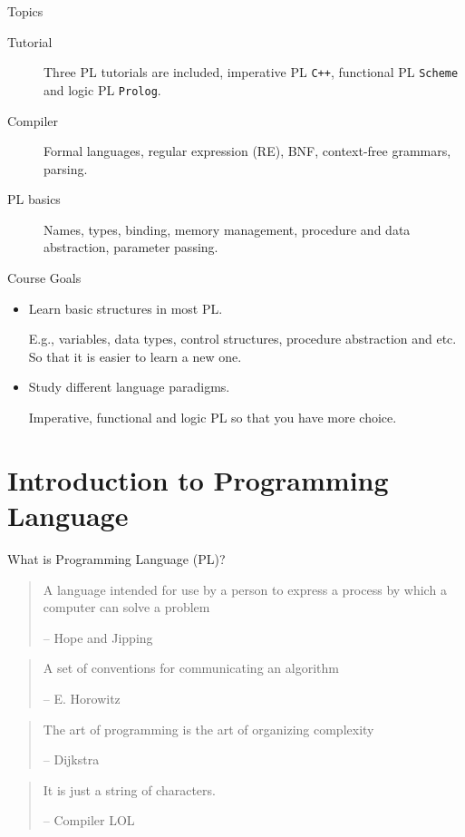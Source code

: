 \documentclass[presentation]{beamer}
\begin{document}
\begin{frame}[fragile,label={sec:orgheadline4}]{Topics}
 \begin{description}
\item[{Tutorial}] Three PL tutorials are included, imperative PL
\texttt{C++}, functional PL \texttt{Scheme} and logic PL \texttt{Prolog}.
\item[{Compiler}] Formal languages, regular expression (RE), BNF,
context-free grammars, parsing.
\item[{PL basics}] Names, types, binding, memory management, procedure
and data abstraction, parameter passing.
\end{description}
\end{frame}

\begin{frame}[label={sec:orgheadline5}]{Course Goals}
\begin{itemize}
\item Learn basic structures in most PL.

E.g., variables, data types, control structures, procedure
abstraction and etc.  So that it is easier to learn a new one.

\item Study different language paradigms.

Imperative, functional and logic PL so that you have more choice.
\end{itemize}
\end{frame}

\section{Introduction to Programming Language}
\label{sec:orgheadline22}

\begin{frame}[label={sec:orgheadline7}]{What is Programming Language (PL)?}
\begin{quote}
A language intended for use by a person to express a process by
which a computer can solve a problem

-- Hope and Jipping
\end{quote}

\begin{quote}
A set of conventions for communicating an algorithm

-- E. Horowitz
\end{quote}

\begin{quote}
The art of programming is the art of organizing complexity

-- Dijkstra
\end{quote}

\begin{quote}
It is just a string of characters.

-- Compiler LOL
\end{quote}
\end{frame}
\end{document}
